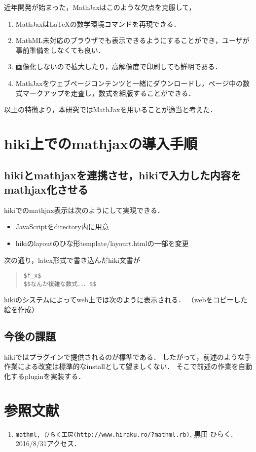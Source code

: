 \documentclass[10pt,a4j,twocolumn]{jsarticle}
\begin{document}
近年開発が始まった，MathJaxはこのような欠点を克服して，
\begin{enumerate}
\item MathJaxはLaTeXの数学環境コマンドを再現できる．
\item MathML未対応のブラウザでも表示できるようにすることができ，ユーザが事前準備をしなくても良い．
\item 画像化しないので拡大したり，高解像度で印刷しても鮮明である．
\item MathJaxをウェブページコンテンツと一緒にダウンロードし，ページ中の数式マークアップを走査し，数式を組版することができる．
\end{enumerate}
以上の特徴より，本研究ではMathJaxを用いることが適当と考えた．

\section{hiki上でのmathjaxの導入手順}
\subsection{hikiとmathjaxを連携させ，hikiで入力した内容をmathjax化させる}
hikiでのmathjax表示は次のようにして実現できる．
\begin{itemize}
\item JavaScriptをdirectory内に用意
\item hikiのlayoutのひな形template/layourt.htmlの一部を変更
\end{itemize}
次の通り，latex形式で書き込んだhiki文書が
\begin{quote}\begin{verbatim}
$f_x$
$$なんか複雑な数式．．．$$
\end{verbatim}\end{quote}
hikiのシステムによってweb上では次のように表示される．
（webをコピーした絵を作成）

\subsection{今後の課題}
hikiではプラグインで提供されるのが標準である．
したがって，前述のような手作業による改変は標準的なinstallとして望ましくない．
そこで前述の作業を自動化するpluginを実装する．

\section{参照文献}\begin{enumerate}
\item \verb|mathml, ひらく工房(http://www.hiraku.ro/?mathml.rb)|, 黒田 ひらく, 2016/8/31アクセス．
\end{enumerate}
\end{document}
